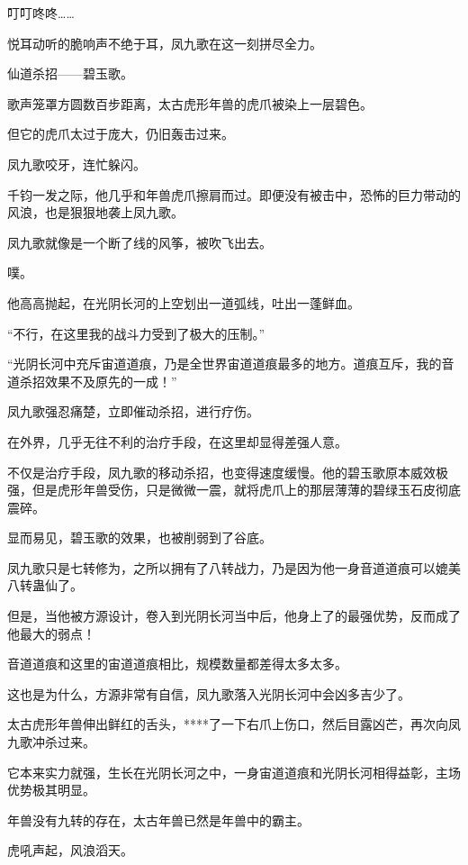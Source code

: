 
\begin{this_body}

叮叮咚咚……

悦耳动听的脆响声不绝于耳，凤九歌在这一刻拼尽全力。

仙道杀招——碧玉歌。

歌声笼罩方圆数百步距离，太古虎形年兽的虎爪被染上一层碧色。

但它的虎爪太过于庞大，仍旧轰击过来。

凤九歌咬牙，连忙躲闪。

千钧一发之际，他几乎和年兽虎爪擦肩而过。即便没有被击中，恐怖的巨力带动的风浪，也是狠狠地袭上凤九歌。

凤九歌就像是一个断了线的风筝，被吹飞出去。

噗。

他高高抛起，在光阴长河的上空划出一道弧线，吐出一蓬鲜血。

“不行，在这里我的战斗力受到了极大的压制。”

“光阴长河中充斥宙道道痕，乃是全世界宙道道痕最多的地方。道痕互斥，我的音道杀招效果不及原先的一成！”

凤九歌强忍痛楚，立即催动杀招，进行疗伤。

在外界，几乎无往不利的治疗手段，在这里却显得差强人意。

不仅是治疗手段，凤九歌的移动杀招，也变得速度缓慢。他的碧玉歌原本威效极强，但是虎形年兽受伤，只是微微一震，就将虎爪上的那层薄薄的碧绿玉石皮彻底震碎。

显而易见，碧玉歌的效果，也被削弱到了谷底。

凤九歌只是七转修为，之所以拥有了八转战力，乃是因为他一身音道道痕可以媲美八转蛊仙了。

但是，当他被方源设计，卷入到光阴长河当中后，他身上了的最强优势，反而成了他最大的弱点！

音道道痕和这里的宙道道痕相比，规模数量都差得太多太多。

这也是为什么，方源非常有自信，凤九歌落入光阴长河中会凶多吉少了。

太古虎形年兽伸出鲜红的舌头，****了一下右爪上伤口，然后目露凶芒，再次向凤九歌冲杀过来。

它本来实力就强，生长在光阴长河之中，一身宙道道痕和光阴长河相得益彰，主场优势极其明显。

年兽没有九转的存在，太古年兽已然是年兽中的霸主。

虎吼声起，风浪滔天。


\end{this_body}
